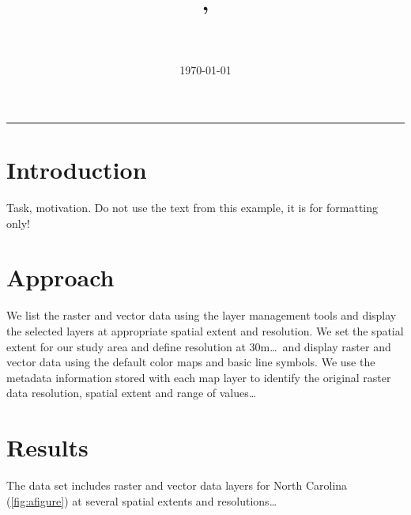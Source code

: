 \documentclass[10pt]{article}
\title{\classId, \classSemestr \\ \className \\ \assignmentTopic}
\author{\authorName}
\date{\today}
\begin{document}
\maketitle
\noindent
\rule{\textwidth}{1.5pt}

\pagestyle{fancy}


\section*{Introduction}

Task, motivation. Do not use the text from this example, it is for formatting only!

\section*{Approach}

We list the raster and vector data using the layer management tools and display
the selected layers at appropriate spatial extent and resolution.
We set the spatial extent for our study area and define resolution at 30m\ldots\ and
display raster and vector data using the default color maps and basic line symbols.
We use the metadata information stored with each map layer to identify
the original raster data resolution, spatial extent and range of values\ldots


\section*{Results}

The data set includes raster and vector data layers for North Carolina (\ref{fig:afigure})
at several spatial extents and resolutions\ldots
\end{document}
